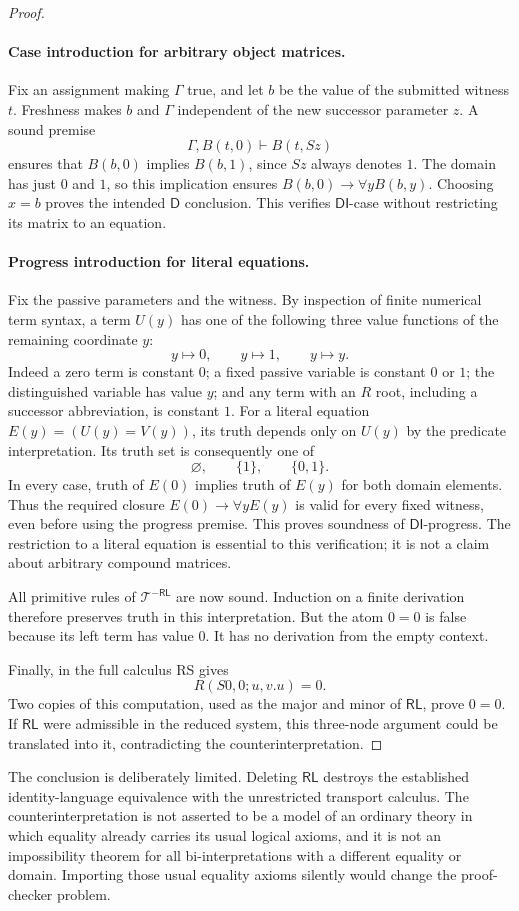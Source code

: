 \begin{proof}
\paragraph{Case introduction for arbitrary object matrices.}
Fix an assignment making $\Gamma$ true, and let $b$ be the value of
the submitted witness $t$. Freshness makes $b$ and $\Gamma$
independent of the new successor parameter $z$. A sound premise
\[
        \Gamma,B(t,0)\vdash B(t,Sz)
\]
ensures that $B(b,0)$ implies $B(b,1)$, since $Sz$ always denotes
$1$. The domain has just $0$ and $1$, so this implication ensures
$B(b,0)\to\forall yB(b,y)$. Choosing $x=b$ proves the intended
$\mathsf D$ conclusion. This verifies $\mathsf{DI}$-case without
restricting its matrix to an equation.

\paragraph{Progress introduction for literal equations.}
Fix the passive parameters and the witness. By inspection of finite
numerical term syntax, a term $U(y)$ has one of the following three
value functions of the remaining coordinate $y$:
\[
                y\longmapsto0,\qquad
                y\longmapsto1,\qquad
                y\longmapsto y.
\]
Indeed a zero term is constant $0$; a fixed passive variable is constant
$0$ or $1$; the distinguished variable has value $y$; and any term
with an $R$ root, including a successor abbreviation, is constant $1$.
For a literal equation $E(y)=(U(y)=V(y))$, its truth depends only on
$U(y)$ by the predicate interpretation. Its truth set is consequently
one of
\[
                       \varnothing,\qquad\{1\},\qquad\{0,1\}.
\]
In every case, truth of $E(0)$ implies truth of $E(y)$ for both domain
elements. Thus the required closure
$E(0)\to\forall yE(y)$ is valid for every fixed witness, even before
using the progress premise. This proves soundness of
$\mathsf{DI}$-progress. The restriction to a literal equation is
essential to this verification; it is not a claim about arbitrary
compound matrices.

All primitive rules of $\mathcal T^{-\mathsf{RL}}$ are now sound.
Induction on a finite derivation therefore preserves truth in this
interpretation. But the atom $0=0$ is false because its left term has
value $0$. It has no derivation from the empty context.

Finally, in the full calculus RS gives
\[
                  R(S0,0;u,v.u)=0.
\]
Two copies of this computation, used as the major and minor of
$\mathsf{RL}$, prove $0=0$. If $\mathsf{RL}$ were admissible in
the reduced system, this three-node argument could be translated into
it, contradicting the counterinterpretation.
\end{proof}

The conclusion is deliberately limited. Deleting $\mathsf{RL}$ destroys
the established identity-language equivalence with the unrestricted
transport calculus. The counterinterpretation is not asserted to be a
model of an ordinary theory in which equality already carries its usual
logical axioms, and it is not an impossibility theorem for all
bi-interpretations with a different equality or domain. Importing those
usual equality axioms silently would change the proof-checker problem.

